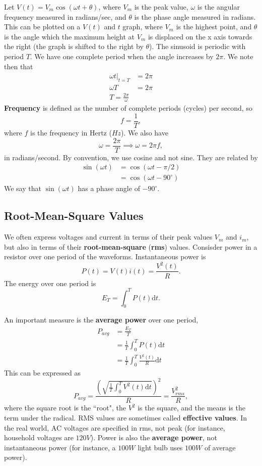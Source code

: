 \documentclass[11pt]{article}
\theoremstyle{plain} %
\theoremstyle{definition}
\theoremstyle{example}
\theoremstyle{remark}
\begin{document}
Let $V(t) = V_m\cos(\omega t+ \theta)$, where $V_m$ is the peak value, $\omega$ is the angular frequency measured in radians/sec, and $\theta$ is the phase angle measured in radians. This can be plotted on a $V(t)$ and $t$ graph, where $V_m$ is the highest point, and $\theta$ is the angle which the maximum height at $V_m$ is displaced on the x axis towards the right (the graph is shifted to the right by $\theta$). The sinusoid is periodic with period $T$. We have one complete period when the angle increases by $2\pi$. We note then that
\begin{align*}
	\omega t|_{t=T} &= 2\pi\\
	\omega T &= 2\pi\\
	T = \frac{2\pi}{\omega}
\end{align*}
\textbf{Frequency} is defined as the number of complete periods (cycles) per second, so 
$$f = \frac{1}{T},$$
where $f$ is the frequency in Hertz ($Hz$). We also have 
$$\omega = \frac{2\pi}{T} \implies \omega = 2\pi f,$$
in radians/second. By convention, we use cosine and not sine. They are related by 
\begin{align*}
	\sin(\omega t) &= \cos(\omega t - \pi/2)\\
	&= \cos(\omega t - 90^{\circ})
\end{align*}
We say that $\sin(\omega t)$ has a phase angle of $-90^{\circ}$. 

\subsection{Root-Mean-Square Values}
We often express voltages and current in terms of their peak values $V_m$ and $i_m$, but also in terms of their \textbf{root-mean-square} (\textbf{rms}) values. Consisder power in a resistor over one period of the waveforms. Instantaneous power is 
$$P(t) = V(t)i(t) = \frac{V^2(t)}{R}.$$
The energy over one period is $$E_T = \int_0^TP(t) \mathrm d t.$$

An important measure is the \textbf{average power} over one period, 
\begin{align*}
	P_{avg} &= \frac{E_T}{T}\\
	&= \frac{1}{T} \int_0^TP(t) \mathrm d t\\
	&= \frac{1}{T} \int_0^T\frac{V^2(t)}{R} \mathrm d t
\end{align*}
This can be expressed as 
$$P_{avg} = \frac{\left(\sqrt{\frac{1}{T}\int_0^TV^2(t)\mathrm d t}\right)^2}{R} = \frac{V_{rms}^2}{R},$$
where the square root is the ``root", the $V^2$ is the square, and the means is the term under the radical. RMS values are sometimes called \textbf{effective values}. In the real world, AC voltages are specified in rms, not peak (for instance, household voltages are $120V$). Power is also the \textbf{average power}, not instantaneous power (for instance, a $100W$ light bulb uses $100W$ of average power). 
\end{document}
